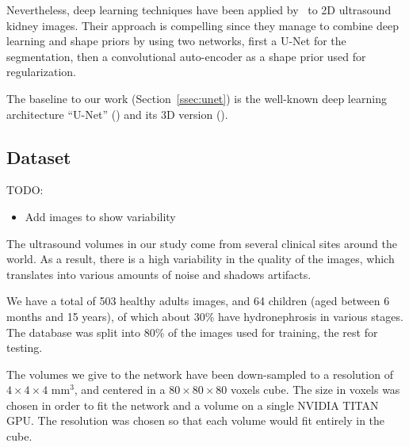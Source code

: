 Nevertheless, deep learning techniques have been applied by~\textcite{ravishankar2017MICCAI} to 2D ultrasound kidney images. Their approach is compelling since they manage to combine deep learning and shape priors by using two networks, first a U-Net for the segmentation, then a convolutional auto-encoder as a shape prior used for regularization.

The baseline to our work (Section~\ref{ssec:unet}) is the well-known deep learning architecture ``U-Net'' (\textcite{ronneberger2015MICCAI}) and its 3D version (\textcite{cicek2016MICCAI}). 


\subsection{Dataset}
\label{ssec:data}

TODO:
\begin{itemize}
    \item Add images to show variability
\end{itemize}

The ultrasound volumes in our study come from several clinical sites around the world. As a result, there is a high variability in the quality of the images, which translates into various amounts of noise and shadows artifacts.

We have a total of 503 healthy adults images, and 64 children (aged between 6 months and 15 years), of which about $30 \%$ have hydronephrosis in various stages. The database was split into $80 \%$ of the images used for training, the rest for testing.

The volumes we give to the network have been down-sampled to a resolution of $4 \times 4 \times 4$ mm$^3$, and centered in a $80 \times 80 \times 80$ voxels cube. The size in voxels was chosen in order to fit the network and a volume on a single NVIDIA TITAN GPU. The resolution was chosen so that each volume would fit entirely in the cube. 

